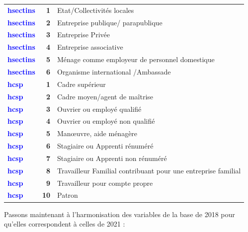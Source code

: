 \documentclass[
]{article}
\begin{document}
\begin{longtable}[t]{>{}l>{}r>{\raggedright\arraybackslash}p{8cm}}
\textcolor{blue}{\textbf{hsectins}} & \textbf{1} & Etat/Collectivités locales\\
\textcolor{blue}{\textbf{hsectins}} & \textbf{2} & Entreprise publique/ parapublique\\
\addlinespace
\textcolor{blue}{\textbf{hsectins}} & \textbf{3} & Entreprise Privée\\
\textcolor{blue}{\textbf{hsectins}} & \textbf{4} & Entreprise associative\\
\textcolor{blue}{\textbf{hsectins}} & \textbf{5} & Ménage comme employeur de personnel domestique\\
\textcolor{blue}{\textbf{hsectins}} & \textbf{6} & Organisme international /Ambassade\\
\textcolor{blue}{\textbf{hcsp}} & \textbf{1} & Cadre supérieur\\
\addlinespace
\textcolor{blue}{\textbf{hcsp}} & \textbf{2} & Cadre moyen/agent de maîtrise\\
\textcolor{blue}{\textbf{hcsp}} & \textbf{3} & Ouvrier ou employé qualifié\\
\textcolor{blue}{\textbf{hcsp}} & \textbf{4} & Ouvrier ou employé non qualifié\\
\textcolor{blue}{\textbf{hcsp}} & \textbf{5} & Manœuvre, aide ménagère\\
\textcolor{blue}{\textbf{hcsp}} & \textbf{6} & Stagiaire ou Apprenti rénuméré\\
\addlinespace
\textcolor{blue}{\textbf{hcsp}} & \textbf{7} & Stagiaire ou Apprenti non rénuméré\\
\textcolor{blue}{\textbf{hcsp}} & \textbf{8} & Travailleur Familial contribuant pour une entreprise familial\\
\textcolor{blue}{\textbf{hcsp}} & \textbf{9} & Travailleur pour compte propre\\
\textcolor{blue}{\textbf{hcsp}} & \textbf{10} & Patron\\
\bottomrule
\end{longtable}

Passons maintenant à l'harmonisation des variables de la base de 2018
pour qu'elles correspondent à celles de 2021 :
\end{document}
